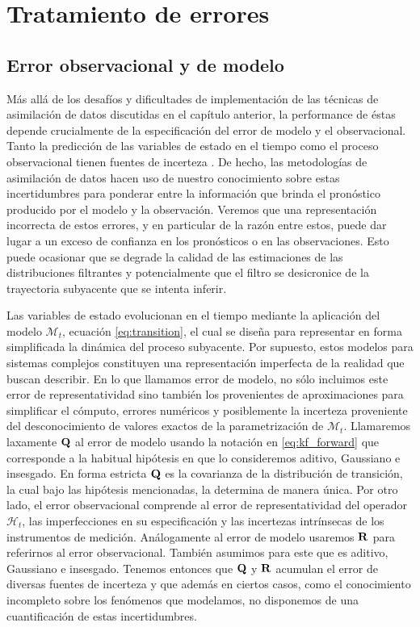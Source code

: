 \chapter{Tratamiento de errores} \label{chp:error_treatment}

\section{Error observacional y de modelo} \label{sec:model_obs_error}

Más allá de los desafíos y dificultades de implementación de las técnicas de asimilación de datos discutidas en el capítulo anterior, la performance de éstas depende crucialmente de la especificación del error de modelo y el observacional. Tanto la predicción de las variables de estado en el tiempo como el proceso observacional tienen fuentes de incerteza \citep{Tandeo2020,Dee1995,Dee1999}. De hecho, las metodologías de asimilación de datos hacen uso de nuestro conocimiento sobre estas incertidumbres para ponderar entre la información que brinda el pronóstico producido por el modelo y la observación. Veremos que una representación incorrecta de estos errores, y en particular de la razón entre estos, puede dar lugar a un exceso de confianza en los pronósticos o en las observaciones. Esto puede ocasionar que se degrade la calidad de las estimaciones de las distribuciones filtrantes y potencialmente que el filtro se desicronice de la trayectoria subyacente que se intenta inferir.

Las variables de estado evolucionan en el tiempo mediante la aplicación del modelo $\mathcal{M}_t$, ecuación \ref{eq:transition}, el cual se diseña para representar en forma simplificada la dinámica del proceso subyacente. Por supuesto, estos modelos para sistemas complejos constituyen una representación imperfecta de la realidad que buscan describir. En lo que llamamos error de modelo, no sólo incluimos este error de representatividad sino también los provenientes de aproximaciones para simplificar el cómputo, errores numéricos y posiblemente la incerteza proveniente del desconocimiento de valores exactos de la parametrización de $\mathcal{M}_t$. Llamaremos laxamente $\mathbf{Q}$ al error de modelo usando la notación en \ref{eq:kf_forward} que corresponde a la habitual hipótesis en que lo consideremos aditivo, Gaussiano e insesgado. En forma estricta $\mathbf{Q}$ es la covarianza de la distribución de transición, la cual bajo las hipótesis mencionadas, la determina de manera única. Por otro lado, el error observacional comprende al error de representatividad del operador $\mathcal{H}_t$, las imperfecciones en su especificación y las incertezas intrínsecas de los instrumentos de medición. Análogamente al error de modelo usaremos $\mathbf{R}$ para referirnos al error observacional. También asumimos para este que es aditivo, Gaussiano e insesgado. Tenemos entonces que $\mathbf{Q}$ y $\mathbf{R}$ acumulan el error de diversas fuentes de incerteza y que además en ciertos casos, como el conocimiento incompleto sobre los fenómenos que modelamos, no disponemos de una cuantificación de estas incertidumbres.

